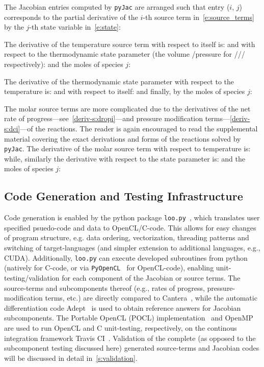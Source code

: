 \documentclass[12pt,number,sort&compress,preprint]{elsarticle}
\begin{document}
The Jacobian entries computed by \texttt{pyJac} are arranged such that entry ($i$, $j$) corresponds to the partial derivative of the $i$-th source term in~\cref{e:source_terms} by the $j$-th state variable in~\cref{e:state}:

The derivative of the temperature source term with respect to itself is:
and with respect to the thermodynamic state parameter (the volume \slash pressure for \conp/\slash\conv/ respectively):
and the moles of species $j$:

The derivative of the thermodynamic state parameter with respect to the temperature is:
and with respect to itself:
and finally, by the moles of species $j$:

The molar source terms are more complicated due to the derivatives of the net rate of progress---see~\cref{deriv-s:dropi}---and pressure modification terms---\cref{deriv-s:dci}---of the reactions.
The reader is again encouraged to read the supplemental material covering the exact derivations and forms of the reactions solved by \texttt{pyJac}.
The derivative of the molar source term with respect to temperature is:
while, similarly the derivative with respect to the state parameter is:
and the moles of species $j$:

\subsection{Code Generation and Testing Infrastructure}
\label{s:unittest}
Code generation is enabled by the python package \texttt{loo.py}~\cite{kloeckner_loopy_2014}, which translates user specified psuedo-code and data to OpenCL\slash C-code.
This allows for easy changes of program structure, e.g. data ordering, vectorization, threading patterns and switching of target-languages (and simpler extension to additional languages, e.g., CUDA).
Additionally, \texttt{loo.py} can execute developed subroutines from python (natively for C-code, or via \texttt{PyOpenCL}~\cite{kloeckner_pycuda_2012} for OpenCL-code), enabling unit-testing\slash validation for each component of the Jacobian or source terms.
The source-terms and subcomponents thereof (e.g., rates of progress, pressure-modification terms, etc.) are directly compared to Cantera~\cite{Cantera}, while the automatic differentiation code Adept~\cite{adept-v11} is used to obtain reference answers for Jacobian subcomponents.
The Portable OpenCL (POCL) implementation~\cite{poclIJPP} and OpenMP~\cite{dagum1998openmp} are used to run OpenCL and C unit-testing, respectively, on the continous integration framework Travis CI~\cite{travis:2018}.
Validation of the complete (as opposed to the subcomponent testing discussed here) generated source-terms and Jacobian codes will be discussed in detail in~\cref{s:validation}.
\end{document}
